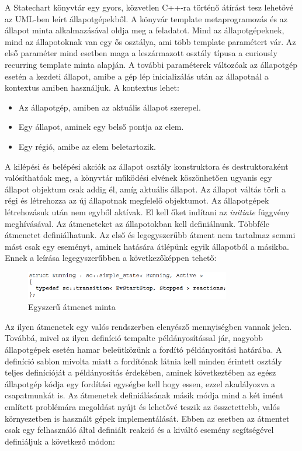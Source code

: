 \documentclass[a4paper,12pt]{report}
\begin{document}
A Statechart könyvtár \cite{donni2007boost} egy gyors, közvetlen C++-ra történő átírást tesz lehetővé az UML-ben leírt állapotgépekből. A könyvár template metaprogramozás és az állapot minta alkalmazásával oldja meg a feladatot. Mind az állapotgépeknek, mind az állapotoknak van egy ős osztálya, ami több template paramétert vár. Az első paraméter mind esetben maga a leszármazott osztály típusa a curiously recurring\cite{coplien1995curiously} template minta alapján. %
A további paraméterek változóak az állapotgép esetén a kezdeti állapot, amibe a gép lép inicializálás után az állapotnál a kontextus amiben használjuk. A kontextus lehet:
\begin{itemize}
\item Az állapotgép, amiben az aktuális állapot szerepel.
\item Egy állapot, aminek egy belső pontja az elem.
\item Egy régió, amibe az elem beletartozik. 
\end{itemize}
A kilépési és belépési akciók az állapot osztály konstruktora és destruktoraként valósíthatóak meg, a könyvtár működési elvének köszönhetően ugyanis egy állapot objektum csak addig él, amíg aktuális állapot. Az állapot váltás törli a régi és létrehozza az új állapotnak megfelelő objektumot. Az állapotgépek létrehozásuk után nem egyből aktívak. El kell őket indítani az {\it initiate} függvény meghívásával. Az átmeneteket az állapotokban kell definiálnunk. Többféle átmenetet definiálhatunk. Az első és legegyszerűbb átment nem tartalmaz semmi mást csak egy eseményt, aminek hatására átlépünk egyik állapotból a másikba. Ennek a leírása legegyszerűbben a következőképpen tehető:

\begin{figure}[hbtp]
\centering
\includegraphics[width=0.8\textwidth]{scst.png}
\caption{Egyszerű átmenet minta}
\label{fig:srtst}
\end{figure}

Az ilyen átmenetek egy valós rendszerben elenyésző mennyiségben vannak jelen. Továbbá, mivel az ilyen definíció tempalte példányosítással jár, nagyobb állapotgépek esetén hamar beleütközünk a fordító példányosítási határába. A definíció sablon mivolta miatt a fordítónak látnia kell minden érintett osztály teljes definícióját a példányosítás érdekében, aminek következtében az egész állapotgép kódja egy fordítási egységbe kell hogy essen, ezzel akadályozva a csapatmunkát is.
Az átmenetek definiálásának másik módja mind a két imént említett problémára megoldást nyújt és lehetővé teszik az összetettebb, valós környezetben is használt gépek implementálását. Ebben az esetben az átmentet csak egy felhasználó által definiált reakció és a kiváltó esemény segítségével definiáljuk a következő módon: 
\end{document}

